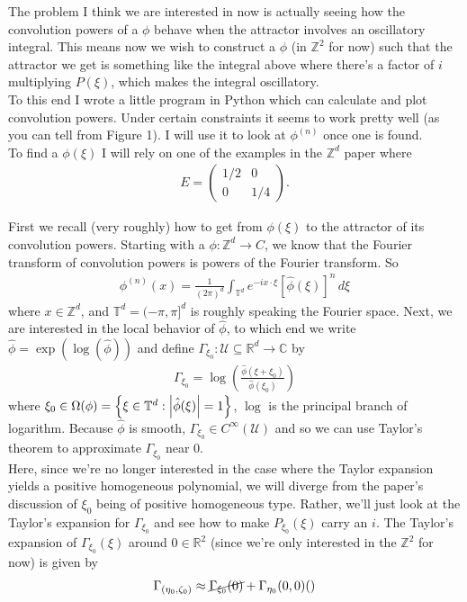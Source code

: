 \documentclass{article}
\theoremstyle{definition}
\newcommand{\C}{\mathbb{C}}
\newcommand{\f}[2]{\frac{#1}{#2}}
\newcommand{\lp}{\left(}
\newcommand{\rp}{\right)}
\newcommand{\lc}{\left\{}
\newcommand{\rc}{\right\}}
\begin{document}
\newpage

The problem I think we are interested in now is actually seeing how the convolution powers of a $\phi$ behave when the attractor involves an oscillatory integral. This means now we wish to construct a $\phi$ (in $\mathbb{Z}^2$ for now) such that the attractor we get is something like the integral above where there's a factor of $i$ multiplying $P(\xi)$, which makes the integral oscillatory. \\

To this end I wrote a little program in Python which can calculate and plot convolution powers. Under certain constraints it seems to work pretty well (as you can tell from Figure 1). I will use it to look at $\phi^{(n)}$ once one is found. \\

To find a $\phi(\xi)$ I will rely on one of the examples in the $\mathbb{Z}^d$ paper where 
\begin{align}
E = \begin{pmatrix}
1/2 & 0\\
0 & 1/4
\end{pmatrix}.
\end{align}


First we recall (very roughly) how to get from $\phi(\xi)$ to the attractor of its convolution powers. Starting with a $\phi: \mathbb{Z}^d \to C$, we know that the Fourier transform of convolution powers is powers of the Fourier transform. So
\begin{align}
\phi^{(n)}(x) = \f{1}{(2\pi)^d}\int_{\mathbb{T}^d} e^{-ix\cdot \xi} [\hat{\phi}(\xi)]^n\,d\xi
\end{align} 
where $x\in \mathbb{Z}^d$, and $\mathbb{T}^d = (-\pi ,\pi ]^d$ is roughly speaking the Fourier space. Next, we are interested in the local behavior of $\hat{\phi}$, to which end we write $\hat{\phi} = \exp\lp \log(\hat{\phi}) \rp$ and define $\Gamma_{\xi_0}: \mathcal{U}\subseteq\mathbb{R}^d \to \C$ by
\begin{align}
\Gamma_{\xi_0} = \log\lp \f{\hat{\phi}(\xi+\xi_0)}{\hat{\phi}(\xi_0)} \rp
\end{align}
where $\xi_0 \in \Omega(\phi) = \lc \xi \in \mathbb{T}^d : \abs{\hat{\phi}(\xi)} = 1 \rc$, $\log$ is the principal branch of logarithm. Because $\hat{\phi}$ is smooth, $\Gamma_{\xi_0} \in C^\infty(\mathcal{U})$ and so we can use Taylor's theorem to approximate $\Gamma_{\xi_0}$ near 0.\\

Here, since we're no longer interested in the case where the Taylor expansion yields a positive homogeneous polynomial, we will diverge from the paper's discussion of $\xi_0$ being of positive homogeneous type. Rather, we'll just look at the Taylor's expansion for $\Gamma_{\xi_0}$ and see how to make $P_{\xi_0}(\xi)$ carry an $i$. The Taylor's expansion of $\Gamma_{\xi_0}(\xi)$ around $0 \in \mathbb{R}^2$ (since we're only interested in the $\mathbb{Z}^2$ for now) is given by
\begin{align}
\Gamma_{(\eta_0,\zeta_0)} \approx \cancel{\Gamma_{\xi_0}(0)} + \Gamma_{\eta_0}(0,0)()
\end{align} 
\end{document}
